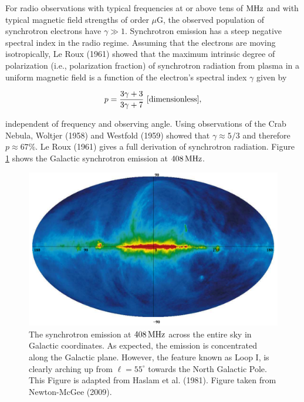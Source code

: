 \documentclass[a4paper,10pt]{article}
\begin{document}
{\noindent}For radio observations with typical frequencies at or above tens of ${\rm MHz}$ and with typical magnetic field strengths of order $\mu$G, the observed population of synchrotron electrons have $\gamma\gg1$. Synchrotron emission has a steep negative spectral index in the radio regime. Assuming that the electrons are moving isotropically, Le Roux (1961) showed that the maximum intrinsic degree of polarization (i.e., polarization fraction) of synchrotron radiation from plasma in a uniform magnetic field is a function of the electron's spectral index $\gamma$ given by

\begin{align*}
    p = \frac{3\gamma + 3}{3\gamma+7} ~ [{\rm dimensionless}],
\end{align*}

{\noindent}independent of frequency and observing angle. Using observations of the Crab Nebula, Woltjer (1958) and Westfold (1959) showed that $\gamma\approx5/3$ and therefore $p\approx67\%$. Le Roux (1961) gives a full derivation of synchrotron radiation. Figure \ref{figure:408mhz} shows the Galactic synchrotron emission at $408\,{\rm MHz}$.

\begin{figure}[h]
\begin{center}
\includegraphics[width=15cm]{figures/408MHz.png}
\caption{\footnotesize{The synchrotron emission at $408\,{\rm MHz}$ across the entire sky in Galactic coordinates. As expected, the emission is concentrated along the Galactic plane. However, the feature known as Loop I, is clearly arching up from $\ell=55^\circ$ towards the North Galactic Pole. This Figure is adapted from Haslam et al. (1981). Figure taken from Newton-McGee (2009).}}
\label{figure:408mhz}
\end{center}
\end{figure}
\end{document}
